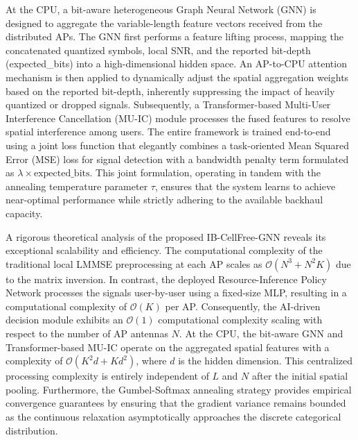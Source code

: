 At the CPU, a bit-aware heterogeneous Graph Neural Network (GNN) is designed to aggregate the variable-length feature vectors received from the distributed APs. The GNN first performs a feature lifting process, mapping the concatenated quantized symbols, local SNR, and the reported bit-depth (expected\_bits) into a high-dimensional hidden space. An AP-to-CPU attention mechanism is then applied to dynamically adjust the spatial aggregation weights based on the reported bit-depth, inherently suppressing the impact of heavily quantized or dropped signals. Subsequently, a Transformer-based Multi-User Interference Cancellation (MU-IC) module processes the fused features to resolve spatial interference among users. The entire framework is trained end-to-end using a joint loss function that elegantly combines a task-oriented Mean Squared Error (MSE) loss for signal detection with a bandwidth penalty term formulated as $\lambda \times \text{expected\_bits}$. This joint formulation, operating in tandem with the annealing temperature parameter $\tau$, ensures that the system learns to achieve near-optimal performance while strictly adhering to the available backhaul capacity.

A rigorous theoretical analysis of the proposed IB-CellFree-GNN reveals its exceptional scalability and efficiency. The computational complexity of the traditional local LMMSE preprocessing at each AP scales as $\mathcal{O}(N^3 + N^2 K)$ due to the matrix inversion. In contrast, the deployed Resource-Inference Policy Network processes the signals user-by-user using a fixed-size MLP, resulting in a computational complexity of $\mathcal{O}(K)$ per AP. Consequently, the AI-driven decision module exhibits an $\mathcal{O}(1)$ computational complexity scaling with respect to the number of AP antennas $N$. At the CPU, the bit-aware GNN and Transformer-based MU-IC operate on the aggregated spatial features with a complexity of $\mathcal{O}(K^2 d + K d^2)$, where $d$ is the hidden dimension. This centralized processing complexity is entirely independent of $L$ and $N$ after the initial spatial pooling. Furthermore, the Gumbel-Softmax annealing strategy provides empirical convergence guarantees by ensuring that the gradient variance remains bounded as the continuous relaxation asymptotically approaches the discrete categorical distribution.